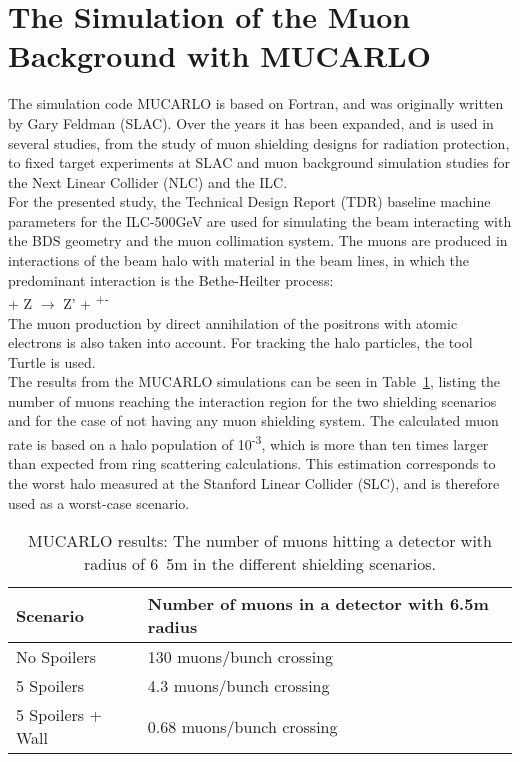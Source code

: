 \section{The Simulation of the Muon Background with MUCARLO}
\label{MUCARLO}

The simulation code MUCARLO is based on Fortran, and was originally written by Gary Feldman (SLAC).
Over the years it has been expanded, and is used in several studies, from the study of muon shielding designs for radiation protection, to fixed target experiments at SLAC and muon background simulation studies for the Next Linear Collider (NLC) and the ILC.\\
For the presented study, the Technical Design Report (TDR) baseline machine parameters for the ILC-500GeV are used for simulating the beam interacting with the BDS geometry and the muon collimation system.
The muons are produced in interactions of the beam halo with material in the beam lines, in which the predominant interaction is the Bethe-Heilter process:\\
\textgamma + Z $\rightarrow$ Z' + \murm\textsuperscript{+}\murm\textsuperscript{-}\\
The muon production by direct annihilation of the positrons with atomic electrons is also taken into account.\cite[sec. 2]{Mucarlo}
For tracking the halo particles, the tool Turtle\cite{Turtle} is used.\\
The results from the MUCARLO simulations can be seen in Table~\ref{tab:MuonRates}, listing the number of muons reaching the interaction region for the two shielding scenarios and for the case of not having any muon shielding system.
The calculated muon rate is based on a halo population of 10\textsuperscript{-3}, which is more than ten times larger than expected from ring scattering calculations.
This estimation corresponds to the worst halo measured at the Stanford Linear Collider (SLC), and is therefore used as a worst-case scenario.

\begin{table}
\caption{MUCARLO results: The number of muons hitting a detector with radius of \unit{6.5}{m} in the different shielding scenarios.}
\label{tab:MuonRates}
\centering
\begin{tabularx}{\textwidth}{ll}
\hline\hline
\textbf{Scenario} & \textbf{Number of muons in a detector with 6.5m radius}\\
\hline
\cline{1-2}
\hline
 No Spoilers & 130 muons/bunch crossing\\
 5 Spoilers& 4.3 muons/bunch crossing\\
 5 Spoilers + Wall & 0.68 muons/bunch crossing\\
\hline\hline
\end{tabularx}
\end{table}